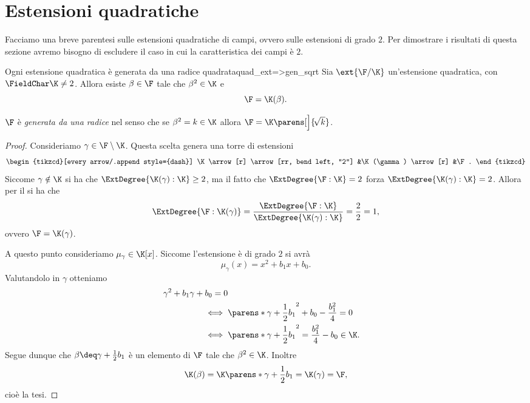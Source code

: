 \section{Estensioni quadratiche}

Facciamo una breve parentesi sulle estensioni quadratiche di campi, ovvero sulle estensioni di grado $2$. Per dimostrare i risultati di questa sezione avremo bisogno di escludere il caso in cui la caratteristica dei campi è $2$. 

\begin{proposition}
    {Ogni estensione quadratica è generata da una radice quadrata}{quad_ext=>gen_sqrt}
    Sia $\ext{\F / \K}$ un'estensione quadratica, con $\FieldChar \K \neq 2$. Allora esiste $\beta \in \F$ tale che $\beta^2 \in \K$ e \[
        \F = \K(\beta).
    \]  
\end{proposition}

\begin{remark}
    $\F$ è \emph{generata da una radice} nel senso che se $\beta^2 = k \in \K$ allora $\F = \K\parens[\Big]{\!\sqrt{k}}$. 
\end{remark}

\begin{proof}
    Consideriamo $\gamma \in \F \setminus \K$. Questa scelta genera una torre di estensioni \[
        \begin{tikzcd}[every arrow/.append style={dash}]
            \K \arrow[r] \arrow[rr, bend left, "2"]
            &\K(\gamma) \arrow[r]
            &\F.
        \end{tikzcd}
    \] Siccome $\gamma \notin \K$ si ha che $\ExtDegree{\K(\gamma) : \K} \geq 2$, ma il fatto che $\ExtDegree{\F : \K} = 2$ forza $\ExtDegree{\K(\gamma) : \K} = 2$. Allora per il  si ha che \[
        \ExtDegree{\F : \K(\gamma)} 
        = \frac{\ExtDegree{\F : \K}}{\ExtDegree{\K(\gamma) : \K}} 
        = \frac{2}{2} 
        = 1,
    \] ovvero $\F = \K(\gamma)$.
    
    A questo punto consideriamo $\mu_\gamma \in \K[x]$. Siccome l'estensione è di grado $2$ si avrà \[
        \mu_\gamma(x) = x^2 + b_1x + b_0.
    \] Valutandolo in $\gamma$ otteniamo \begin{align*}
        \gamma^2 + b_1\gamma + b_0 = 0\\
        \iff {}&\parens*{\gamma + \frac12b_1}^2 + b_0 - \frac{b_1^2}{4} = 0\\
        \iff {}&\parens*{\gamma + \frac12b_1}^2 = \frac{b_1^2}{4} - b_0 \in \K.
    \end{align*} Segue dunque che $\beta \deq \gamma + \frac12b_1$ è un elemento di $\F$ tale che $\beta^2 \in \K$. Inoltre \[
        \K(\beta) = \K\parens*{\gamma + \frac12b_1} = \K(\gamma) = \F,
    \] cioè la tesi.
\end{proof}

